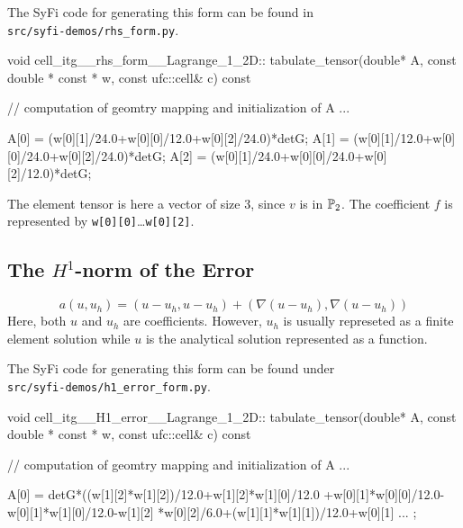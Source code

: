 The SyFi code for generating this form can be found in \\
\texttt{src/syfi-demos/rhs\_form.py}.

\begin{code}
void cell_itg__rhs_form__Lagrange_1_2D::
     tabulate_tensor(double* A, const double * const * w,
                     const ufc::cell& c) const
{
  // computation of geomtry mapping and initialization of A ...
 
  A[0] = (w[0][1]/24.0+w[0][0]/12.0+w[0][2]/24.0)*detG;
  A[1] = (w[0][1]/12.0+w[0][0]/24.0+w[0][2]/24.0)*detG;
  A[2] = (w[0][1]/24.0+w[0][0]/24.0+w[0][2]/12.0)*detG;
}
\end{code}
The element tensor is here a vector of size 3, since $v$ is in $\P_2$. 
The coefficient $f$ is represented by \texttt{w[0][0]}\ldots\texttt{w[0][2]}. 

\subsection{The $H^1$-norm of the Error}
\begin{equation}
a(u,u_h) = (u-u_h, u-u_h) + (\nabla (u-u_h), \nabla(u-u_h))    
\end{equation}
Here, both $u$ and $u_h$ are coefficients. However, $u_h$ is usually
represeted as a finite element solution while $u$ is the analytical 
solution represented as a function. 

The SyFi code for generating this form can be found under \\ 
\texttt{src/syfi-demos/h1\_error\_form.py}.

\begin{code}
void cell_itg__H1_error__Lagrange_1_2D::
     tabulate_tensor(double* A, const double * const * w,
                     const ufc::cell& c) const
{

  // computation of geomtry mapping and initialization of A ...

  A[0] = detG*((w[1][2]*w[1][2])/12.0+w[1][2]*w[1][0]/12.0
       +w[0][1]*w[0][0]/12.0-w[0][1]*w[1][0]/12.0-w[1][2]
       *w[0][2]/6.0+(w[1][1]*w[1][1])/12.0+w[0][1]  ... ; 
}
\end{code}
